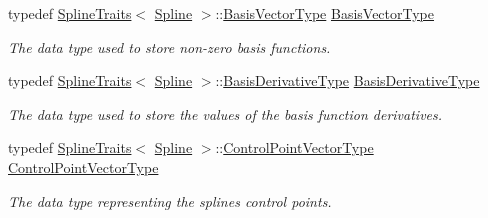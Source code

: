 \begin{DoxyCompactItemize}
\mbox{\label{group___splines___module_a1d49cef942ea59d85d1711ee32354e6b}} 
typedef \hyperlink{struct_eigen_1_1_spline_traits}{Spline\+Traits}$<$ \hyperlink{group___splines___module_class_eigen_1_1_spline}{Spline} $>$\+::\hyperlink{group___splines___module_a1d49cef942ea59d85d1711ee32354e6b}{Basis\+Vector\+Type} \hyperlink{group___splines___module_a1d49cef942ea59d85d1711ee32354e6b}{Basis\+Vector\+Type}
\begin{DoxyCompactList}\small\item\em The data type used to store non-\/zero basis functions. \end{DoxyCompactList}\item 
\mbox{\label{group___splines___module_a9db0b0108353660cd03524f2e67d6b3c}} 
typedef \hyperlink{struct_eigen_1_1_spline_traits}{Spline\+Traits}$<$ \hyperlink{group___splines___module_class_eigen_1_1_spline}{Spline} $>$\+::\hyperlink{group___splines___module_a9db0b0108353660cd03524f2e67d6b3c}{Basis\+Derivative\+Type} \hyperlink{group___splines___module_a9db0b0108353660cd03524f2e67d6b3c}{Basis\+Derivative\+Type}
\begin{DoxyCompactList}\small\item\em The data type used to store the values of the basis function derivatives. \end{DoxyCompactList}\item 
\mbox{\label{group___splines___module_ac42c673462a98ad1779761bebeb450bf}} 
typedef \hyperlink{struct_eigen_1_1_spline_traits}{Spline\+Traits}$<$ \hyperlink{group___splines___module_class_eigen_1_1_spline}{Spline} $>$\+::\hyperlink{group___splines___module_ac42c673462a98ad1779761bebeb450bf}{Control\+Point\+Vector\+Type} \hyperlink{group___splines___module_ac42c673462a98ad1779761bebeb450bf}{Control\+Point\+Vector\+Type}
\begin{DoxyCompactList}\small\item\em The data type representing the spline\textquotesingle{}s control points. \end{DoxyCompactList}\end{DoxyCompactItemize}
